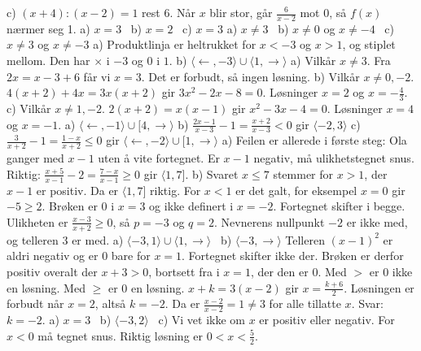 c) $(x+4) : (x-2) = 1$ rest $6$. Når $x$ blir stor, går $\frac{6}{x-2}$ mot 0, så $f(x)$ nærmer seg 1.
 a) $x = 3$ \ b) $x = 2$ \ c) $x = 3$
 a) $x \neq 3$ \ b) $x \neq 0$ og $x \neq -4$ \ c) $x \neq 3$ og $x \neq -3$
 a) Produktlinja er heltrukket for $x < -3$ og $x > 1$, og stiplet mellom. Den har $\times$ i $-3$ og $0$ i $1$.
b) $\langle \leftarrow, -3\rangle \cup \langle 1, \rightarrow\rangle$
 a) Vilkår $x \neq 3$. Fra $2x = x - 3 + 6$ får vi $x = 3$. Det er forbudt, så ingen løsning.
b) Vilkår $x \neq 0, -2$. $4(x+2) + 4x = 3x(x+2)$ gir $3x^2 - 2x - 8 = 0$. Løsninger $x = 2$ og $x = -\frac{4}{3}$.
c) Vilkår $x \neq 1, -2$. $2(x+2) = x(x-1)$ gir $x^2 - 3x - 4 = 0$. Løsninger $x = 4$ og $x = -1$.
 a) $\langle \leftarrow, -1\rangle \cup [4, \rightarrow\rangle$
b) $\frac{2x-1}{x-3} - 1 = \frac{x+2}{x-3} < 0$ gir $\langle -2, 3\rangle$
c) $\frac{3}{x+2} - 1 = \frac{1-x}{x+2} \le 0$ gir $\langle \leftarrow, -2\rangle \cup [1, \rightarrow\rangle$
 a) Feilen er allerede i første steg: Ola ganger med $x - 1$ uten å vite fortegnet. Er $x - 1$ negativ, må ulikhetstegnet snus.
Riktig: $\frac{x+5}{x-1} - 2 = \frac{7-x}{x-1} \ge 0$ gir $\langle 1, 7]$.
b) Svaret $x \le 7$ stemmer for $x > 1$, der $x - 1$ er positiv. Da er $\langle 1, 7]$ riktig. For $x < 1$ er det galt, for eksempel $x = 0$ gir $-5 \ge 2$.
 Brøken er 0 i $x = 3$ og ikke definert i $x = -2$. Fortegnet skifter i begge. Ulikheten er $\frac{x-3}{x+2} \ge 0$, så $p = -3$ og $q = 2$. Nevnerens nullpunkt $-2$ er ikke med, og telleren 3 er med.
 a) $\langle -3, 1\rangle \cup \langle 1, \rightarrow\rangle$ \ b) $\langle -3, \rightarrow\rangle$
Telleren $(x-1)^2$ er aldri negativ og er 0 bare for $x = 1$. Fortegnet skifter ikke der. Brøken er derfor positiv overalt der $x + 3 > 0$, bortsett fra i $x = 1$, der den er 0. Med $>$ er 0 ikke en løsning. Med $\ge$ er 0 en løsning.
 $x + k = 3(x - 2)$ gir $x = \frac{k+6}{2}$. Løsningen er forbudt når $x = 2$, altså $k = -2$. Da er $\frac{x-2}{x-2} = 1 \neq 3$ for alle tillatte $x$. Svar: $k = -2$.
 a) $x = 3$ \ b) $\langle -3, 2\rangle$ \ c) Vi vet ikke om $x$ er positiv eller negativ. For $x < 0$ må tegnet snus. Riktig løsning er $0 < x < \frac{5}{2}$.

